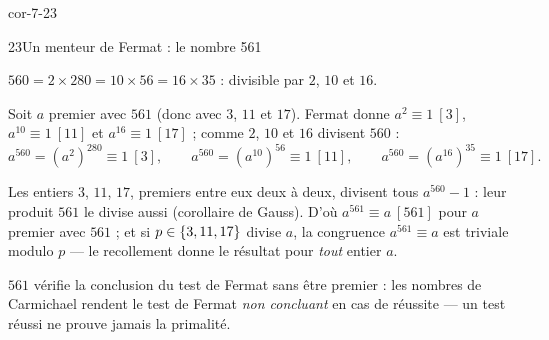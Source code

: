 \begin{blocLivre}{cor-7-23}
\begin{corrige}{23}{Un menteur de Fermat : le nombre 561}
\begin{questions}
  \item $560=2\times280=10\times56=16\times35$ : divisible par $2$, $10$
    et $16$.
  \item Soit $a$ premier avec $561$ (donc avec $3$, $11$ et $17$). Fermat
    donne $a^{2}\equiv1\ [3]$, $a^{10}\equiv1\ [11]$ et
    $a^{16}\equiv1\ [17]$ ; comme $2$, $10$ et $16$ divisent $560$ :
    \[
      a^{560}=(a^{2})^{280}\equiv1\ [3],\qquad
      a^{560}=(a^{10})^{56}\equiv1\ [11],\qquad
      a^{560}=(a^{16})^{35}\equiv1\ [17].
    \]
  \item Les entiers $3$, $11$, $17$, premiers entre eux deux à deux,
    divisent tous $a^{560}-1$ : leur produit $561$ le divise aussi
    (corollaire de Gauss). D'où $a^{561}\equiv a\ [561]$ pour $a$ premier
    avec $561$ ; et si $p\in\left\{3,11,17\right\}$ divise $a$, la congruence
    $a^{561}\equiv a$ est triviale modulo $p$ — le recollement donne le
    résultat pour \emph{tout} entier $a$.
  \item $561$ vérifie la conclusion du test de Fermat sans être premier :
    les nombres de Carmichael rendent le test de Fermat \emph{non
    concluant} en cas de réussite — un test réussi ne prouve jamais la
    primalité.
\end{questions}
\end{corrige}
\end{blocLivre}

